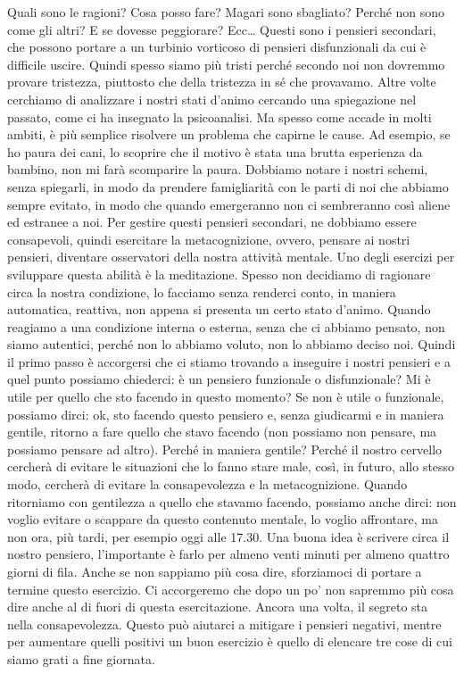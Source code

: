 \documentclass[12pt]{book} %
\begin{document}
Quali sono le ragioni? Cosa posso fare? Magari sono sbagliato? Perché non sono come gli altri? E se dovesse peggiorare?
Ecc… Questi sono i pensieri secondari, che possono portare a un turbinio vorticoso di pensieri disfunzionali da cui è
difficile uscire. Quindi spesso siamo più tristi perché secondo noi non dovremmo provare tristezza, piuttosto che della
tristezza in sé che provavamo. Altre volte cerchiamo di analizzare i nostri stati d'animo cercando
una spiegazione nel passato, come ci ha insegnato la psicoanalisi. Ma spesso come accade in molti ambiti, è più
semplice risolvere un problema che capirne le cause. Ad esempio, se ho paura dei cani, lo scoprire che il motivo è
stata una brutta esperienza da bambino, non mi farà scomparire la paura. Dobbiamo notare i nostri schemi, senza
spiegarli, in modo da prendere famigliarità con le parti di noi che abbiamo sempre evitato, in modo che quando
emergeranno non ci sembreranno così aliene ed estranee a noi. Per gestire questi pensieri secondari, ne dobbiamo essere
consapevoli, quindi esercitare la metacognizione, ovvero, pensare ai nostri pensieri, diventare osservatori della
nostra attività mentale. Uno degli esercizi per sviluppare questa abilità è la meditazione. Spesso non decidiamo di
ragionare circa la nostra condizione, lo facciamo senza renderci conto, in maniera automatica, reattiva, non appena si
presenta un certo stato d'animo. Quando reagiamo a una condizione interna o esterna, senza che ci
abbiamo pensato, non siamo autentici, perché non lo abbiamo voluto, non lo abbiamo deciso noi. Quindi il primo passo è
accorgersi che ci stiamo trovando a inseguire i nostri pensieri e a quel punto possiamo chiederci: è un pensiero
funzionale o disfunzionale? Mi è utile per quello che sto facendo in questo momento? Se non è utile o funzionale,
possiamo dirci: ok, sto facendo questo pensiero e, senza giudicarmi e in maniera gentile, ritorno a fare quello che
stavo facendo (non possiamo non pensare, ma possiamo pensare ad altro). 
Perché in maniera gentile? Perché il nostro cervello cercherà di evitare le situazioni che lo fanno
stare male, così, in futuro, allo stesso modo, cercherà di evitare la consapevolezza e la metacognizione. Quando
ritorniamo con gentilezza a quello che stavamo facendo, possiamo anche dirci: non voglio evitare o scappare da questo
contenuto mentale, lo voglio affrontare, ma non ora, più tardi, per esempio oggi alle 17.30. Una buona idea è scrivere
circa il nostro pensiero, l'importante è farlo per almeno venti minuti per almeno quattro giorni
di fila. Anche se non sappiamo più cosa dire, sforziamoci di portare a termine questo esercizio. Ci accorgeremo che
dopo un po' non sapremmo più cosa dire anche al di fuori di questa esercitazione. Ancora una volta, il segreto sta
nella consapevolezza. Questo può aiutarci a mitigare i pensieri negativi, mentre per aumentare quelli positivi un buon esercizio è quello di elencare tre cose di cui siamo grati a fine giornata.
\end{document}
